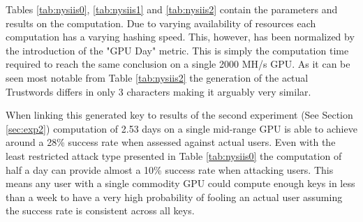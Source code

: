 Tables \ref{tab:nysiis0}, \ref{tab:nysiis1} and \ref{tab:nysiis2} contain the parameters and results on the computation. Due to varying availability of resources each computation has a varying hashing speed. This, however, has been normalized by the introduction of the "GPU Day" metric. This is simply the computation time required to reach the same conclusion on a single 2000 MH/s GPU. As it can be seen most notable from Table \ref{tab:nysiis2} the generation of the actual Trustwords differs in only 3 characters making it arguably very similar. 

When linking this generated key to results of the second experiment (See Section \ref{sec:exp2}) computation of 2.53 days on a single mid-range GPU is able to achieve around a 28\% success rate when assessed against actual users. Even with the least restricted attack type presented in Table \ref{tab:nysiis0} the computation of half a day can provide almost a 10\% success rate when attacking users. This means any user with a single commodity GPU could compute enough keys in less than a week to have a very high probability of fooling an actual user assuming the success rate is consistent across all keys.